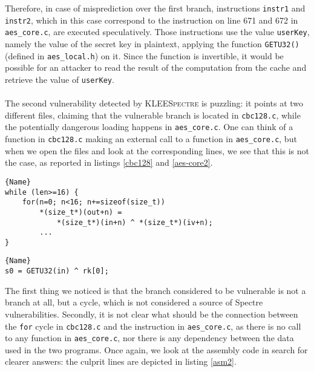 \documentclass[target=mst,aauheader=aics]{thud}
\theoremstyle{definition}
\begin{document}
	Therefore, in case of misprediction over the first branch, instructions \texttt{instr1} and \texttt{instr2}, which in this case correspond to the instruction on line 671 and 672 in \texttt{aes\_core.c}, are executed speculatively. Those instructions use the value \texttt{userKey}, namely the value of the secret key in plaintext, applying the function \texttt{GETU32()} (defined in \texttt{aes\_local.h}) on it. Since the function is invertible, it would be possible for an attacker to read the result of the computation from the cache and retrieve the value of \texttt{userKey}.
	\paragraph{}The second vulnerability detected by \textsc{KLEESpectre} is puzzling: it points at two different files, claiming that the vulnerable branch is located in \texttt{cbc128.c}, while the potentially dangerous loading happens in \texttt{aes\_core.c}. One can think of a function in \texttt{cbc128.c} making an external call to a function in \texttt{aes\_core.c}, but when we open the files and look at the corresponding lines, we see that this is not the case, as reported in listings \ref{cbc128} and \ref{aes-core2}.
	
	\lstset{
		numbers=left
	}
	\begin{minipage}{.7\textwidth}
		\begin{lstlisting}[caption=\texttt{cbc128.c}, firstnumber=92, label=cbc128]{Name}
while (len>=16) {
	for(n=0; n<16; n+=sizeof(size_t))
		*(size_t*)(out+n) = 
			*(size_t*)(in+n) ^ *(size_t*)(iv+n);
		...
}
		\end{lstlisting}
	\end{minipage}

	\begin{minipage}{.5\textwidth}
		\begin{lstlisting}[caption=\texttt{aes\_core.c}, firstnumber=797, label=aes-core2]{Name}
s0 = GETU32(in) ^ rk[0];
		\end{lstlisting}
	\end{minipage}
	\vspace{3mm}

	The first thing we noticed is that the branch considered to be vulnerable is not a branch at all, but a cycle, which is not considered a source of Spectre vulnerabilities. Secondly, it is not clear what should be the connection between the \texttt{for} cycle in \texttt{cbc128.c} and the instruction in \texttt{aes\_core.c}, as there is no call to any function in \texttt{aes\_core.c}, nor there is any dependency between the data used in the two programs. Once again, we look at the assembly code in search for clearer answers: the culprit lines are depicted in listing \ref{asm2}.
	
\end{document}
